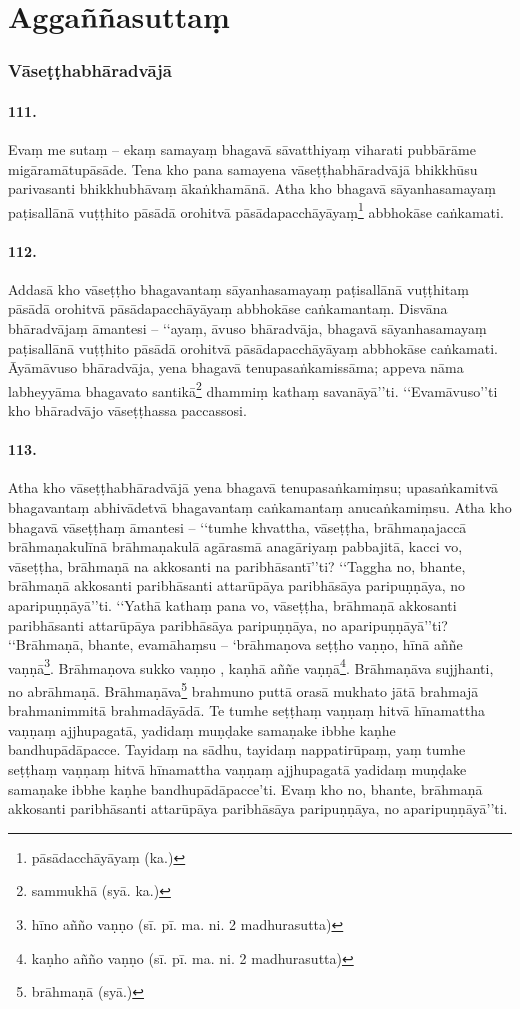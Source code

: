 \section{Aggaññasuttaṃ}

\subsubsection{Vāseṭṭhabhāradvājā}

\paragraph{111.} Evaṃ me sutaṃ – ekaṃ samayaṃ bhagavā sāvatthiyaṃ viharati pubbārāme migāramātupāsāde. Tena kho pana samayena vāseṭṭhabhāradvājā bhikkhūsu parivasanti bhikkhubhāvaṃ ākaṅkhamānā. Atha kho bhagavā sāyanhasamayaṃ paṭisallānā vuṭṭhito pāsādā orohitvā pāsādapacchāyāyaṃ\footnote{pāsādacchāyāyaṃ (ka.)} abbhokāse caṅkamati.

\paragraph{112.} Addasā kho vāseṭṭho bhagavantaṃ sāyanhasamayaṃ paṭisallānā vuṭṭhitaṃ pāsādā orohitvā pāsādapacchāyāyaṃ abbhokāse caṅkamantaṃ. Disvāna bhāradvājaṃ āmantesi – ‘‘ayaṃ, āvuso bhāradvāja, bhagavā sāyanhasamayaṃ paṭisallānā vuṭṭhito pāsādā orohitvā pāsādapacchāyāyaṃ abbhokāse caṅkamati. Āyāmāvuso bhāradvāja, yena bhagavā tenupasaṅkamissāma; appeva nāma labheyyāma bhagavato santikā\footnote{sammukhā (syā. ka.)} dhammiṃ kathaṃ savanāyā’’ti. ‘‘Evamāvuso’’ti kho bhāradvājo vāseṭṭhassa paccassosi.

\paragraph{113.} Atha kho vāseṭṭhabhāradvājā yena bhagavā tenupasaṅkamiṃsu; upasaṅkamitvā bhagavantaṃ abhivādetvā bhagavantaṃ caṅkamantaṃ anucaṅkamiṃsu. Atha kho bhagavā vāseṭṭhaṃ āmantesi – ‘‘tumhe khvattha, vāseṭṭha, brāhmaṇajaccā brāhmaṇakulīnā brāhmaṇakulā agārasmā anagāriyaṃ pabbajitā, kacci vo, vāseṭṭha, brāhmaṇā na akkosanti na paribhāsantī’’ti? ‘‘Taggha no, bhante, brāhmaṇā akkosanti paribhāsanti attarūpāya paribhāsāya paripuṇṇāya, no aparipuṇṇāyā’’ti. ‘‘Yathā kathaṃ pana vo, vāseṭṭha, brāhmaṇā akkosanti paribhāsanti attarūpāya paribhāsāya paripuṇṇāya, no aparipuṇṇāyā’’ti? ‘‘Brāhmaṇā, bhante, evamāhaṃsu – ‘brāhmaṇova seṭṭho vaṇṇo, hīnā aññe vaṇṇā\footnote{hīno añño vaṇṇo (sī. pī. ma. ni. 2 madhurasutta)}. Brāhmaṇova sukko vaṇṇo , kaṇhā aññe vaṇṇā\footnote{kaṇho añño vaṇṇo (sī. pī. ma. ni. 2 madhurasutta)}. Brāhmaṇāva sujjhanti, no abrāhmaṇā. Brāhmaṇāva\footnote{brāhmaṇā (syā.)} brahmuno puttā orasā mukhato jātā brahmajā brahmanimmitā brahmadāyādā. Te tumhe seṭṭhaṃ vaṇṇaṃ hitvā hīnamattha vaṇṇaṃ ajjhupagatā, yadidaṃ muṇḍake samaṇake ibbhe kaṇhe bandhupādāpacce. Tayidaṃ na sādhu, tayidaṃ nappatirūpaṃ, yaṃ tumhe seṭṭhaṃ vaṇṇaṃ hitvā hīnamattha vaṇṇaṃ ajjhupagatā yadidaṃ muṇḍake samaṇake ibbhe kaṇhe bandhupādāpacce’ti. Evaṃ kho no, bhante, brāhmaṇā akkosanti paribhāsanti attarūpāya paribhāsāya paripuṇṇāya, no aparipuṇṇāyā’’ti.

